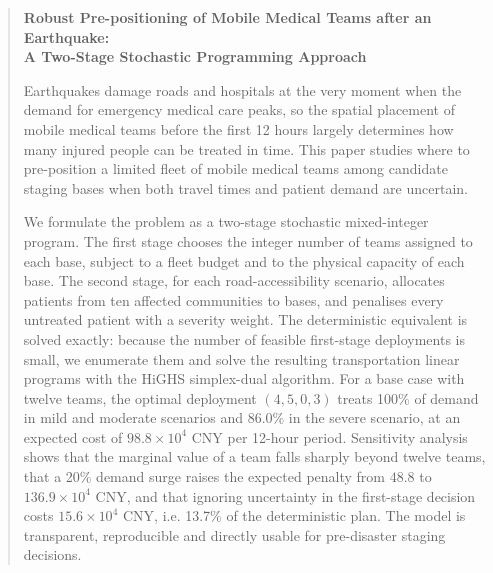 \documentclass{apmcmthesis}
\begin{document}
\pagestyle{frontmatterstyle}

\begin{abstract}
\begin{center}
\Large\bfseries Robust Pre-positioning of Mobile Medical Teams after an Earthquake:\\[2pt]
A Two-Stage Stochastic Programming Approach
\end{center}
\vspace{0.4em}

Earthquakes damage roads and hospitals at the very moment when the demand for emergency medical care peaks, so the spatial placement of mobile medical teams before the first 12 hours largely determines how many injured people can be treated in time. This paper studies where to pre-position a limited fleet of mobile medical teams among candidate staging bases when both travel times and patient demand are uncertain.

We formulate the problem as a two-stage stochastic mixed-integer program. The first stage chooses the integer number of teams assigned to each base, subject to a fleet budget and to the physical capacity of each base. The second stage, for each road-accessibility scenario, allocates patients from ten affected communities to bases, and penalises every untreated patient with a severity weight. The deterministic equivalent is solved exactly: because the number of feasible first-stage deployments is small, we enumerate them and solve the resulting transportation linear programs with the HiGHS simplex-dual algorithm. For a base case with twelve teams, the optimal deployment $(4,5,0,3)$ treats 100\% of demand in mild and moderate scenarios and 86.0\% in the severe scenario, at an expected cost of $98.8\times10^{4}$ CNY per 12-hour period. Sensitivity analysis shows that the marginal value of a team falls sharply beyond twelve teams, that a 20\% demand surge raises the expected penalty from $48.8$ to $136.9\times10^{4}$ CNY, and that ignoring uncertainty in the first-stage decision costs $15.6\times10^{4}$ CNY, i.e. 13.7\% of the deterministic plan. The model is transparent, reproducible and directly usable for pre-disaster staging decisions.

\end{abstract}

\newpage
\begingroup
\fontsize{9}{11}\selectfont
\tableofcontents
\endgroup
\end{document}
